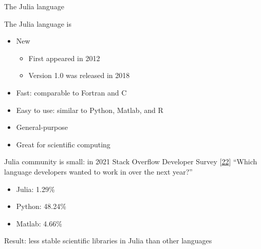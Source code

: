 \documentclass[10pt,american,ignorenonframetext,aspectratio=1610]{beamer}
\providecommand{\tightlist}{%
  \setlength{\itemsep}{0pt}\setlength{\parskip}{0pt}}
\theoremstyle{remark}
\begin{document}
\begin{frame}{The Julia language}
\protect\hypertarget{the-julia-language}{}

The Julia language is

\begin{itemize}
\tightlist
\item
  New

  \begin{itemize}
  \tightlist
  \item
    First appeared in 2012
  \item
    Version 1.0 was released in 2018
  \end{itemize}
\item
  Fast: comparable to Fortran and C
\item
  Easy to use: similar to Python, Matlab, and R
\item
  General-purpose
\item
  Great for scientific computing
\end{itemize}

Julia community is small: in 2021 Stack Overflow Developer Survey
{[}\protect\hyperlink{ref-so_survey2021}{22}{]} ``Which language
developers wanted to work in over the next year?''

\begin{itemize}
\tightlist
\item
  Julia: 1.29\%
\item
  Python: 48.24\%
\item
  Matlab: 4.66\%
\end{itemize}

Result: less stable scientific libraries in Julia than other languages

\end{frame}
\end{document}
